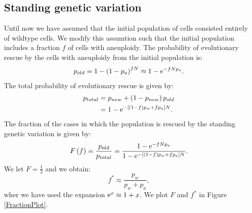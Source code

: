 \documentclass[12pt]{extarticle}
\newcommand{\e}{{\rm e}}
\begin{document}
\subsection*{Standing genetic variation}
Until now we have assumed that the initial population of cells consisted entirely of wildtype cells. We modify this assumtion such that the initial population includes a fraction $f$ of cells with aneuploidy. The probability of evolutionary rescue by the cells with aneuploidy from the initial population is:
\begin{equation*}
p_{old}=1-\left(1-p_a\right)^{fN}\approx 1-\e^{-fNp_a}.
\end{equation*}
The total probability of evolutionary rescue is given by:
\begin{align}\nonumber
p_{total}&=p_{new}+\left(1-p_{new}\right)p_{old}\\
&=1-\e^{-\left[\left(1-f\right)p_w+fp_a\right]N}.
\end{align}
The fraction of the cases in which the population is rescued by the standing genetic variation is given by:
\begin{align*}
F\left(f\right)=\frac{p_{old}}{p_{total}}=\frac{ 1-\e^{-fNp_a}}{1-\e^{-\left[\left(1-f\right)p_w+fp_a\right]N}}.
\end{align*}
We let $F=\frac{1}{2}$ and we obtain:
\begin{equation}\label{halfeqstandvar}
f^*\approx\frac{p_w}{p_w+p_a},
\end{equation}
wher we have used the expansion $\e^x\approx 1+x$.
We plot $F$ and $f^*$ in Figure \ref{FractionPlot}.

\end{document}
